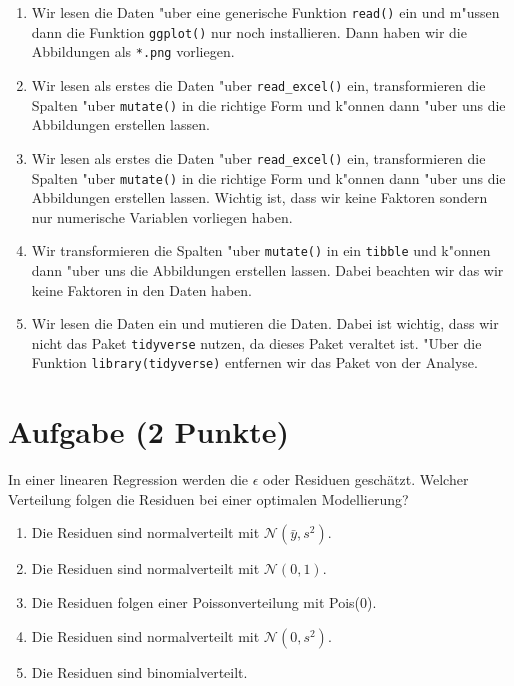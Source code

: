 \documentclass[a4paper, 10pt]{scrartcl}\usepackage[]{graphicx}\usepackage[]{xcolor}
\begin{document}
\begin{enumerate}
\item [\textbf{A} \msquare] Wir lesen die Daten {"u}ber eine generische Funktion \texttt{read()} ein und m{"u}ssen dann die Funktion \texttt{ggplot()} nur noch installieren. Dann haben wir die Abbildungen als \texttt{*.png} vorliegen.
\item [\textbf{B} \msquare] Wir lesen als erstes die Daten {"u}ber \texttt{read\_excel()} ein, transformieren die Spalten {"u}ber \texttt{mutate()} in die richtige Form und k{"o}nnen dann {"u}ber  uns die Abbildungen erstellen lassen.
\item [\textbf{C} \msquare] Wir lesen als erstes die Daten {"u}ber \texttt{read\_excel()} ein, transformieren die Spalten {"u}ber \texttt{mutate()} in die richtige Form und k{"o}nnen dann  {"u}ber  uns die Abbildungen erstellen lassen. Wichtig ist, dass wir keine Faktoren sondern nur numerische Variablen vorliegen haben.
\item [\textbf{D} \msquare] Wir transformieren die Spalten {"u}ber \texttt{mutate()} in ein \texttt{tibble} und k{"o}nnen dann {"u}ber  uns die Abbildungen erstellen lassen. Dabei beachten wir das wir keine Faktoren in den Daten haben.
\item [\textbf{E} \msquare] Wir lesen die Daten ein und mutieren die Daten. Dabei ist wichtig, dass wir nicht das Paket \texttt{tidyverse} nutzen, da dieses Paket veraltet ist. {"U}ber die Funktion \texttt{library(tidyverse)} entfernen wir das Paket von der Analyse.
\end{enumerate}

\section{Aufgabe \hfill (2 Punkte)}

In einer linearen Regression werden die $\epsilon$ oder Residuen
gesch{\"a}tzt. Welcher Verteilung folgen die Residuen bei einer optimalen
Modellierung? 



\begin{enumerate}
\item [\textbf{A} \msquare] Die Residuen sind normalverteilt mit $\mathcal{N}(\bar{y}, s^2)$.
\item [\textbf{B} \msquare] Die Residuen sind normalverteilt mit $\mathcal{N}(0, 1)$.
\item [\textbf{C} \msquare] Die Residuen folgen einer Poissonverteilung mit Pois(0).
\item [\textbf{D} \msquare] Die Residuen sind normalverteilt mit $\mathcal{N}(0, s^2)$.
\item [\textbf{E} \msquare] Die Residuen sind binomialverteilt.
\end{enumerate}
\end{document}
